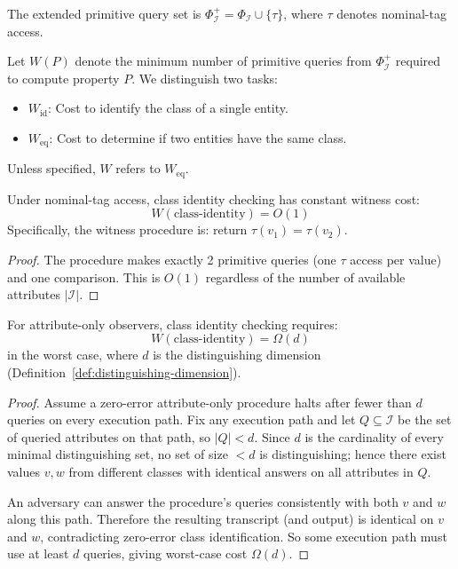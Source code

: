 \begin{definition}
The extended primitive query set is $\Phi_{\mathcal{I}}^+ = \Phi_{\mathcal{I}} \cup \{\tau\}$, where $\tau$ denotes nominal-tag access.
\end{definition}

\begin{definition}
Let $W(P)$ denote the minimum number of primitive queries from $\Phi_{\mathcal{I}}^+$ required to compute property $P$. We distinguish two tasks:
\begin{itemize}
\item $W_{\text{id}}$: Cost to identify the class of a single entity.
\item $W_{\text{eq}}$: Cost to determine if two entities have the same class.
\end{itemize}
Unless specified, $W$ refers to $W_{\text{eq}}$.
\end{definition}

\begin{theorem}\label{thm:constant-witness}
Under nominal-tag access, class identity checking has constant witness cost:
\[
W(\text{class-identity}) = O(1)
\]
Specifically, the witness procedure is: return $\tau(v_1) = \tau(v_2)$.
\end{theorem}

\begin{proof}
The procedure makes exactly 2 primitive queries (one $\tau$ access per value) and one comparison. This is $O(1)$ regardless of the number of available attributes $|\mathcal{I}|$.
\end{proof}

\begin{theorem}\label{thm:interface-lower-bound}
For attribute-only observers, class identity checking requires:
\[
W(\text{class-identity}) = \Omega(d)
\]
in the worst case, where $d$ is the distinguishing dimension (Definition~\ref{def:distinguishing-dimension}).
\end{theorem}

\begin{proof}
Assume a zero-error attribute-only procedure halts after fewer than $d$ queries on every execution path. Fix any execution path and let $Q \subseteq \mathcal{I}$ be the set of queried attributes on that path, so $|Q|<d$. Since $d$ is the cardinality of every minimal distinguishing set, no set of size $<d$ is distinguishing; hence there exist values $v,w$ from different classes with identical answers on all attributes in $Q$.

An adversary can answer the procedure's queries consistently with both $v$ and $w$ along this path. Therefore the resulting transcript (and output) is identical on $v$ and $w$, contradicting zero-error class identification. So some execution path must use at least $d$ queries, giving worst-case cost $\Omega(d)$.
\end{proof}

